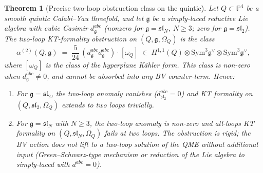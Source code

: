 \documentclass[11pt]{article}
\newtheorem{theorem}{Theorem}[section]
\providecommand{\Om}{\Omega}
\providecommand{\fg}{\mathfrak{g}}
\begin{document}
\begin{theorem}[Precise two-loop obstruction class on the quintic]
\label{thm:quintic-two-loop}
\ClaimStatusTheorem
Let $Q \subset \mathbb P^4$ be a smooth quintic Calabi--Yau
threefold, and let $\fg$ be a simply-laced reductive Lie algebra
with cubic Casimir $d^{abc}_\fg$ (nonzero for $\fg = \mathfrak{sl}_N$,
$N \geq 3$;  zero for $\fg = \mathfrak{sl}_2$).  The two-loop
KT-formality obstruction on $(Q, \fg, \Om_Q)$ is the class
\[
  \alpha^{(2)}(Q, \fg)
  \;=\; \frac{5}{24}\,(d^{abc}_\fg d^{abc}_\fg) \cdot [\omega_Q]
  \;\in\; H^{1,1}(Q) \otimes \mathrm{Sym}^3 \fg^\vee \otimes \mathrm{Sym}^3 \fg^\vee,
\]
where $[\omega_Q]$ is the class of the hyperplane K\"ahler form.
This class is \emph{non-zero} when $d^{abc}_\fg \neq 0$, and cannot
be absorbed into any BV counter-term.  Hence:
\begin{enumerate}[label=\textup{(\arabic*)}]
\item For $\fg = \mathfrak{sl}_2$, the two-loop anomaly vanishes
($d^{abc}_{\mathfrak{sl}_2} = 0$) and KT formality on $(Q,
\mathfrak{sl}_2, \Om_Q)$ extends to two loops trivially.
\item For $\fg = \mathfrak{sl}_N$ with $N \geq 3$, the two-loop
anomaly is non-zero and all-loops KT formality on $(Q, \mathfrak{sl}_N,
\Om_Q)$ fails at two loops.  The obstruction is rigid; the BV action
does not lift to a two-loop solution of the QME without additional
input (Green--Schwarz-type mechanism or reduction of the Lie
algebra to simply-laced with $d^{abc} = 0$).
\end{enumerate}
\end{theorem}
\end{document}
